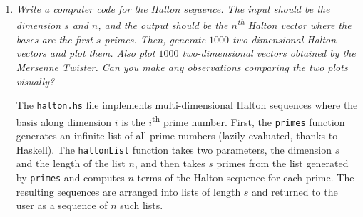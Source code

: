 \documentclass{article}
\begin{document}
\begin{enumerate}
\begin{figure}[H]
\begin{minipage}{\textwidth}
            \end{minipage}
        \end{figure}
    \item
        {\it Write a computer code for the Halton sequence.
        The input should be the dimension $s$ and $n$, and the output should be the $n$\textsuperscript{th} Halton vector where the bases are the first $s$ primes.
        Then, generate $1000$ two-dimensional Halton vectors and plot them.
        Also plot $1000$ two-dimensional vectors obtained by the Mersenne Twister.
        Can you make any observations comparing the two plots visually?}

        The \texttt{halton.hs} file implements multi-dimensional Halton sequences where the basis along dimension $i$ is the $i$\textsuperscript{th} prime number.
        First, the \texttt{primes} function generates an infinite list of all prime numbers (lazily evaluated, thanks to Haskell).
        The \texttt{haltonList} function takes two parameters, the dimension $s$ and the length of the list $n$,
        and then takes $s$ primes from the list generated by \texttt{primes} and computes $n$ terms of the Halton sequence for each prime.
        The resulting sequences are arranged into lists of length $s$ and returned to the user as a sequence of $n$ such lists.


\end{enumerate}
\end{document}
